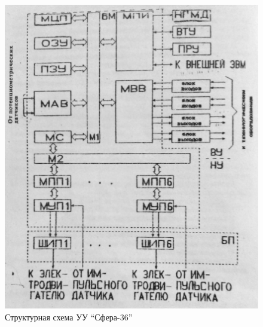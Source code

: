 \begin{figure}[ht]
\centering
    \includegraphics[scale=0.25]{Figures/2.png}
    \caption{Структурная схема УУ ``Сфера-36''\label{fig:str1}}
\end{figure}

